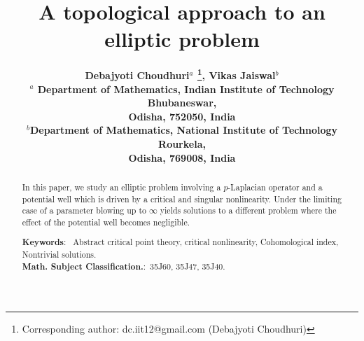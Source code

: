 \documentclass[12pt]{extarticle}
\theoremstyle{definition}
\theoremstyle{remark}
\theoremstyle{definition}
\numberwithin{equation}{section}
\numberwithin{equation}{section}
\begin{document}
	
	
	
	
	
	\title{A topological approach to an elliptic problem}
	\author{\bf Debajyoti Choudhuri$^{a}$ \footnote{Corresponding author: dc.iit12@gmail.com (Debajyoti Choudhuri)}, Vikas Jaiswal$^{b}$ \\
		\small{$^{a}$ Department of Mathematics, Indian Institute of Technology Bhubaneswar,}\\
		\small{Odisha, 752050, India} \\
	\small{$^{b}$Department of Mathematics, National Institute of Technology Rourkela,}\\
	\small{Odisha, 769008, India}	\\}
	\maketitle
	\begin{abstract}
		\noindent 	In this paper, we study an elliptic problem involving a $p$-Laplacian operator and a potential well  which is driven by a critical and singular nonlinearity. Under the limiting case of a parameter blowing up to $\infty$ yields solutions to a different problem where the effect of the potential well becomes negligible. 
			\begin{flushleft}
			{\bf Keywords}:~ Abstract critical point theory, critical nonlinearity, Cohomological index, Nontrivial solutions.\\
			{\bf Math. Subject Classification.}:~35J60, 35J47, 35J40.
		\end{flushleft}
	\end{abstract}
	
\end{document}

